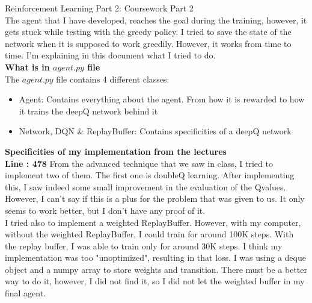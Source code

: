 \documentclass{article}[12pt]
\title{}
\author{Alexandre Allani, CID : 1797836}
\date{\today}
\begin{document}
\maketitle Reinforcement Learning Part 2: Coursework Part 2\\
The agent that I have developed, reaches the goal during the training, however, it gets stuck while testing with the greedy policy. I tried to save the state of the network when it is supposed to work greedily. However, it works from time to time. I'm explaining in this document what I tried to do.\\

\textbf{What is in $agent.py$ file\\}
The $agent.py$ file contains 4 different classes:
\begin{itemize}
\itemsep 0em
\item Agent: Contains everything about the agent. From how it is rewarded to how it trains the deepQ network behind it
\item Network, DQN \& ReplayBuffer: Contains specificities of a deepQ network
\end{itemize}

\textbf{Specificities of my implementation from the lectures\\}
\textbf{Line : 478 }From the advanced technique that we saw in class, I tried to implement two of them. The first one is doubleQ learning. After implementing this, I saw indeed some small improvement in the evaluation of the Qvalues. However, I can't say if this is a plus for the problem that was given to us. It only seems to work better, but I don't have any proof of it.\\
I tried also to implement a weighted ReplayBuffer. However, with my computer, without the weighted ReplayBuffer, I could train for around 100K steps. With the replay buffer, I was able to train only for around 30K steps. I think my implementation was too "unoptimized", resulting in that loss. I was using a deque object and a numpy array to store weights and transition. There must be a better way to do it, however, I did not find it, so I did not let the weighted buffer in my final agent.\\
\end{document}
